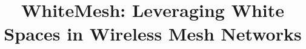 \documentclass[10pt,conference]{IEEEtran}
\begin{document}
\title{WhiteMesh: Leveraging White Spaces in Wireless Mesh Networks}





\maketitle



%




%

%






\end{document}
